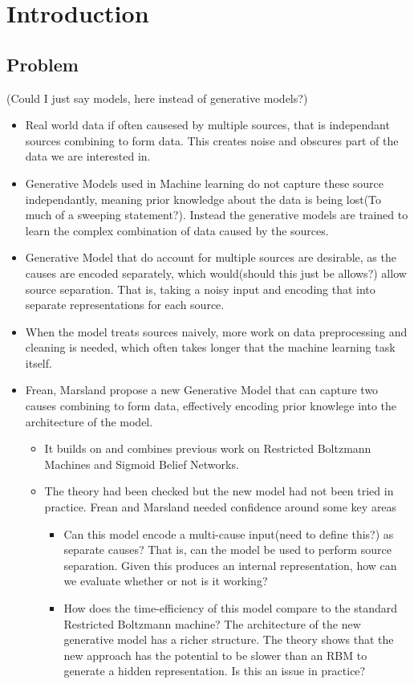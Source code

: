 \chapter{Introduction}

\section{Problem}
(Could I just say models, here instead of generative models?)
\begin{itemize}
  \item Real world data if often causesed by multiple sources, that is independant sources combining to form data.  This creates noise and obscures part of the data we are interested in.
  \item Generative Models used in Machine learning do not capture these source independantly, meaning prior knowledge about the data is being lost(To much of a sweeping statement?). Instead the generative models are trained to learn the complex combination of data caused by the sources.
  \item Generative Model that do account for multiple sources are desirable, as the causes are encoded separately, which would(should this just be allows?) allow source separation. That is, taking a noisy input and encoding that into separate representations for each source.
  \item When the model treats sources naively, more work on data preprocessing and cleaning is needed, which often takes longer that the machine learning task itself.
  \item Frean, Marsland propose a new Generative Model that can capture two causes combining to form data, effectively encoding prior knowlege into the architecture of the model.
  \begin{itemize}
    \item It builds on and combines previous work on Restricted Boltzmann Machines and Sigmoid Belief Networks.
    \item The theory had been checked but the new model had not been tried in practice. Frean and Marsland needed confidence around some key areas
    \begin{itemize}
      \item Can this model encode a multi-cause input(need to define this?) as separate causes? That is, can the model be used to perform source separation. Given this produces an internal representation, how can we evaluate whether or not is it working?
      \item How does the time-efficiency of this model compare to the standard Restricted Boltzmann machine? The architecture of the new generative model has a richer structure. The theory shows that the new approach has the potential to be slower than an RBM to generate a hidden representation. Is this an issue in practice?

\end{itemize}
\end{itemize}
\end{itemize}
